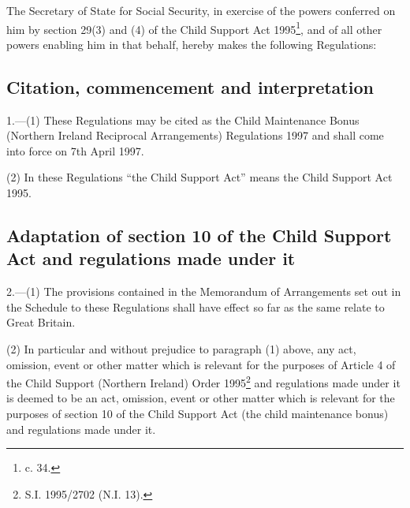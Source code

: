 \documentclass[12pt,a4paper]{article}
\title{\regstitle}
\author{S.I. 1997 No. 645}
\date{Made 6th March 1997\\Laid before Parliament 12th March 1997\\Coming into force 7th April 1997}
\begin{document}
\maketitle

\noindent
The Secretary of State for Social Security, in exercise of the powers conferred on him by section 29(3) and (4) of the Child Support Act 1995\footnote{ c. 34.}, and of all other powers enabling him in that behalf, hereby makes the following Regulations:


{\sloppy

\tableofcontents

}

\setcounter{secnumdepth}{-2}

\subsection[1. Citation, commencement and interpretation]{Citation, commencement and interpretation}

1.—(1) These Regulations may be cited as the Child Maintenance Bonus (Northern Ireland Reciprocal Arrangements) Regulations 1997 and shall come into force on 7th April 1997.

(2) In these Regulations “the Child Support Act” means the Child Support Act 1995.

\subsection[2. Adaptation of section 10 of the Child Support Act and regulations made under it]{Adaptation of section 10 of the Child Support Act and regulations made under it}

2.—(1) The provisions contained in the Memorandum of Arrangements set out in the Schedule to these Regulations shall have effect so far as the same relate to Great Britain.

(2) In particular and without prejudice to paragraph (1) above, any act, omission, event or other matter which is relevant for the purposes of Article 4 of the Child Support (Northern Ireland) Order 1995\footnote{\frenchspacing S.I. 1995/2702 (N.I. 13).} and regulations made under it is deemed to be an act, omission, event or other matter which is relevant for the purposes of section 10 of the Child Support Act (the child maintenance bonus) and regulations made under it.
\end{document}
